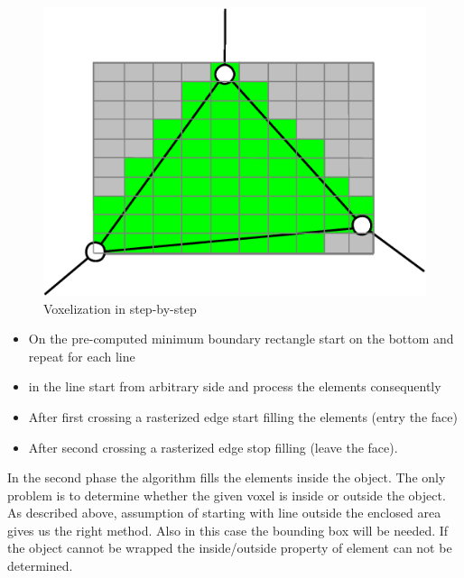 \begin{figure}
\includegraphics[scale=0.25]{../img/voxelize_4.eps}

\caption{Voxelization in step-by-step}
\label{fig:voxelize}

\end{figure}

\begin{itemize}
\item On the pre-computed minimum boundary rectangle start on the bottom and repeat for each line
\item in the line start from arbitrary side and process the elements consequently
\item After first crossing a rasterized edge start filling the elements (entry the face)
\item After second crossing a rasterized edge stop filling (leave the face).

\end{itemize}

In the second phase the algorithm fills the elements inside the object. The only problem is to
determine whether the given voxel is inside or outside the object. As described above, assumption of
starting with line outside the enclosed area gives us the right method. Also in this case the
bounding box will be needed. If the object cannot be wrapped the inside/outside property of element can 
not be determined.
